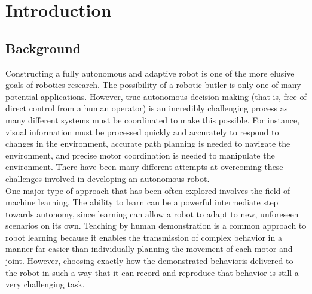 \documentclass{sig-alternate}
\begin{document}
\section{Introduction}
\label{sec:intro}
\subsection{Background}
\indent Constructing a fully autonomous and adaptive robot is one of the more
elusive goals of robotics research.
The possibility of a robotic butler is only one of many potential applications. However, true
autonomous decision making (that is, free of direct control from a human operator) is an incredibly challenging process as many different systems must 
be coordinated to make this possible. For instance, visual information must be processed quickly and accurately to respond to 
changes in the environment, accurate path planning is needed to navigate the environment, and 
precise motor coordination is needed to manipulate the environment. There have been many different 
attempts at overcoming these challenges involved in developing an autonomous robot. \\
\indent One major type of approach 
that has been often explored involves the field of machine learning. The ability to learn can be a powerful intermediate 
step towards autonomy, since learning can allow a robot to adapt to new, unforeseen scenarios on its own. 
Teaching by human demonstration is a common approach to robot learning because it enables the 
transmission of complex behavior in a manner far easier than individually planning the movement of each motor and joint. However, choosing exactly how the demonstrated behavioris delivered to the robot in such a way that it can record and reproduce that behavior is still a very challenging task.
\end{document}
